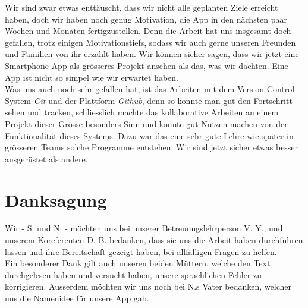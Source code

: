 \documentclass[a4paper,11pt]{article}
\begin{document}
Wir sind zwar etwas enttäuscht, dass wir nicht alle geplanten Ziele erreicht haben, doch wir haben noch genug Motivation, die App in den nächsten paar Wochen und Monaten fertigzustellen. Denn die Arbeit hat uns insgesamt doch gefallen, trotz einigen Motivationstiefs, sodass wir auch gerne unseren Freunden und Familien von ihr erzählt haben.
Wir können sicher sagen, dass wir jetzt eine Smartphone App als grösseres Projekt ansehen als das, was wir dachten. Eine App ist nicht so simpel wie wir erwartet haben.\\

Was uns auch noch sehr gefallen hat, ist das Arbeiten mit dem Version Control System \textit{Git} und der Plattform \textit{Github}, denn so konnte man gut den Fortschritt sehen und tracken, schliesslich machte das kollaborative Arbeiten an einem Projekt dieser Grösse besonders Sinn und konnte gut Nutzen machen von der Funktionalität dieses Systems.
Dazu war das eine sehr gute Lehre wie später in grösseren Teams solche Programme entstehen. Wir sind jetzt sicher etwas besser ausgerüstet als andere.

\section{Danksagung}
Wir - S. und N. - möchten uns bei unserer Betreuungslehrperson V. Y., und unserem Koreferenten D. B. bedanken, dass sie uns die Arbeit haben durchführen lassen und ihre Bereitschaft gezeigt haben, bei allfälligen Fragen zu helfen.\\

Ein besonderer Dank gilt auch unseren beiden Müttern, welche den Text durchgelesen haben und versucht haben, unsere sprachlichen Fehler zu korrigieren. Ausserdem möchten wir uns noch bei N.s Vater bedanken, welcher uns die Namenidee für unsere App gab.

\clearpage
\printglossary

\newpage
\printbibliography[heading=bibnumbered, title={Literaturverzeichnis}]
\end{document}
